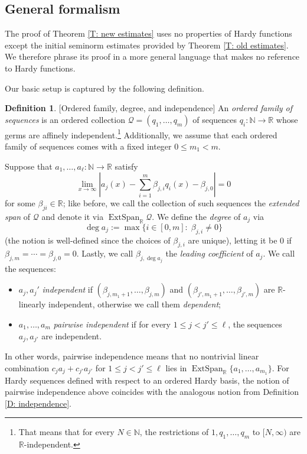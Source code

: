 \documentclass[11pt]{amsart}
\theoremstyle{definition}
\newtheorem{definition}[lemma]{Definition}
\newcommand{\N}{{\mathbb N}}
\newcommand{\R}{{\mathbb R}}
\newcommand{\CQ}{{\mathcal Q}}
\newcommand{\1}{{\mathbf{1}}}
\DeclareMathOperator{\extspan}{ExtSpan}
\newcommand{\abs}[1]{\mathopen{}\left| #1\mathclose{}\right|}
\begin{document}
\subsection{General formalism}

The proof of Theorem \ref{T: new estimates} uses no properties of Hardy functions except the initial seminorm estimates provided by Theorem \ref{T: old estimates}. We therefore phrase its proof in a more general language that makes no reference to Hardy functions.

Our basic setup is captured by the following definition.
\begin{definition}\label{d47}[Ordered family, degree, and independence]\label{D: degree and independence}
   An \textit{ordered family of sequences} is an ordered collection $\CQ =(q_1, \ldots, q_m)$ of sequences $q_i: \N\to\R$ whose germs are affinely independent.\footnote{That means that for every  $N\in\N$, the restrictions of $1, q_1, \ldots, q_m$ to $[N, \infty)$ are $\R$-independent.} Additionally, we assume that each ordered family of sequences comes with a fixed integer $0\leq m_1<m$.

    Suppose that $a_1, \ldots, a_\ell:\N\to\R$ satisfy
        $$\lim_{x\to\infty}\abs{a_j(x) - \sum\limits_{i=1}^m \beta_{j,i} q_i(x) - \beta_{j,0}} = {0}$$ for some $\beta_{ji}\in\R$; like before, we call the collection of such sequences the \textit{extended span} of $\CQ$ and denote it via $\extspan_\R\CQ$.
    We define the \textit{degree} of $a_j$ via $$\deg a_j := \max\{i\in[0, m]:\; \beta_{j,i}\neq 0\}$$
    (the notion is well-defined since the choices of $\beta_{j,i}$ are unique),
    letting it be 0 if $\beta_{j,m} = \cdots = \beta_{j,0} = 0$. Lastly, we call $\beta_{j, \deg a_j}$ the \textit{leading coefficient} of $a_j$.
    We call the sequences:
    \begin{itemize}
        \item $a_j, a_j'$  \textit{independent}  if $(\beta_{j, m_1+1}, \ldots, \beta_{j, m})$ and $(\beta_{j', m_1+1}, \ldots, \beta_{j',m})$ are $\R$-linearly independent, otherwise we call them \textit{dependent};
        \item $a_1, \ldots, a_m$ \textit{pairwise independent} if for every $1\leq j < j' \leq \ell$, the sequences $a_j, a_{j'}$ are independent. 
    \end{itemize}
\end{definition}
In other words, pairwise independence means that no nontrivial linear combination $c_j a_j + c_{j'}a_{j'}$ for $1\leq j < j' \leq \ell$ lies in $\extspan_\R\{a_1, \ldots, a_{m_1}\}$. For Hardy sequences defined with respect to an ordered Hardy basis, the notion of pairwise independence above coincides with the analogous notion from Definition \ref{D: independence}.
\end{document}
